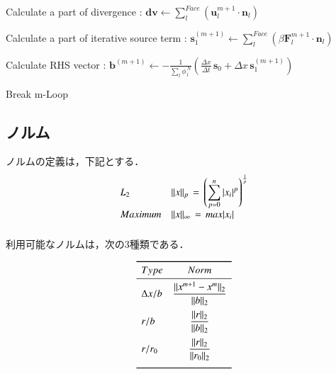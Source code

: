 \begin{algorithm}
\begin{algorithmic}
\State Calculate a part of divergence : $\displaystyle{ \bm{dv} \gets \sum \limits_l^{Face} \left( \bm{u}^{m+1}_l \cdot \bm{n}_l \right) }$

\State Calculate a part of iterative source term : $\bm{s}_1^{(m+1)} \gets \sum \limits_l^{Face} \left( \beta \bm{F}_l^{m+1} \cdot \bm{n}_l \right)$

\State Calculate RHS vector : $ \displaystyle{ \bm{b}^{(m+1)} \gets - \frac{1}{\sum \limits_l \phi^{\,N}_{\,l}} \left( \frac{\Delta x}{\Delta t} \, \bm{s}_0 + \Delta x \, \bm{s}_1^{(m+1)} \right) }$

\State Break m-Loop
\EndIf

\EndFor

\end{algorithmic}
\end{algorithm}




%
\subsection{ノルム}
ノルムの定義は，下記とする．
\begin{equation}
\begin{array}{ll}
L_2 &
\displaystyle{ \| x \|_p \,=\, 
\left( \sum_{p=0}^n {|x_i|^p} \right)^{\frac{1}{p}}
}\\
\vspace{2mm}
Maximum & \| x \|_{\infty} \,=\, max|x_i|\\
\end{array}
\label{eq:def_norm}
\end{equation}

利用可能なノルムは，次の3種類である．

\begin{equation}
\begin{array}{lc} \toprule
Type & Norm \\ \midrule
\vspace{2mm}
\Delta x / b & \displaystyle{ \frac{\|x^{m+1}-x^m \|_2}{\|b\|_2} } \\ 
\vspace{2mm}
r/b & \displaystyle{ \frac{\| r \|_2}{\|b\|_2} } \\ 
\vspace{2mm}
r/r_0 & \displaystyle{ \frac{\|r\|_2}{\|r_0\|_2} } \\  \bottomrule
\end{array}
\label{eq:iter_norm}
\end{equation}







